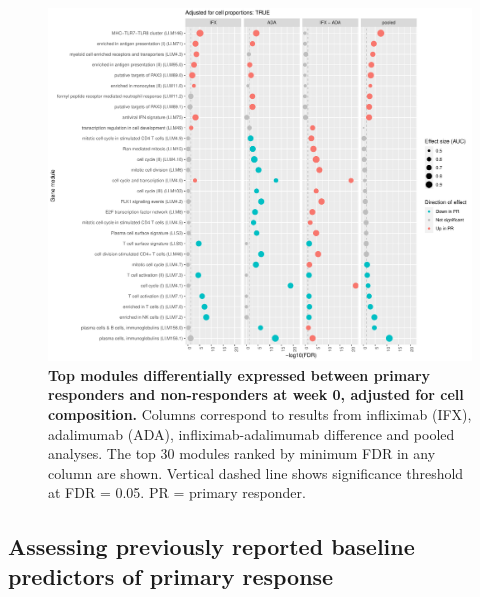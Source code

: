 \begin{figure}
    \centering
    \includegraphics[width=1.0\textwidth,page=1]{mainmatter/figures/chapter_04/plot_gene_set_enrichment.tmodCERNO_panelplot_reversed_C_1RI_1NI,C_1RA_1NA,C_(1RI_1NI)_(1RA_1NA),C_1R_1N.cell_prop_correction_TRUE.pdf}
    \caption{
        \textbf{Top modules differentially expressed between primary responders and non-responders at week 0, adjusted for cell composition.}
        Columns correspond to results from infliximab (IFX), adalimumab (ADA), infliximab-adalimumab difference and pooled analyses. 
        The top 30 modules ranked by minimum \gls{FDR} in any column are shown. Vertical dashed line shows significance threshold at FDR = 0.05.
        PR = primary responder.
    }
    \label{fig:multipants_dge_panelPlot_week_0_R_N_cellPropT}
\end{figure}

\subsection{Assessing previously reported baseline predictors of primary response}

